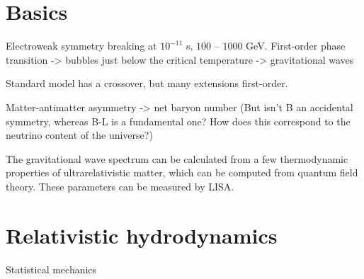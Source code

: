 \section{Basics}
Electroweak symmetry breaking at $10^{-11}$ s, $100$ -- $1000$ GeV.
First-order phase transition
-> bubbles just below the critical temperature
-> gravitational waves

Standard model has a crossover, but many extensions first-order.

Matter-antimatter asymmetry -> net baryon number
(But isn't B an accidental symmetry, whereas B-L is a fundamental one?
How does this correspond to the neutrino content of the universe?)
\cite{lecture_notes}

The gravitational wave spectrum can be calculated from a few thermodynamic properties of ultrarelativistic matter, which can be computed from quantum field theory.
These parameters can be measured by LISA.

\section{Relativistic hydrodynamics}
Statistical mechanics \cite{huang_statistical_1987}
\cite{schroeder_thermal_2000}
\cite[ch. 4]{lecture_notes}

